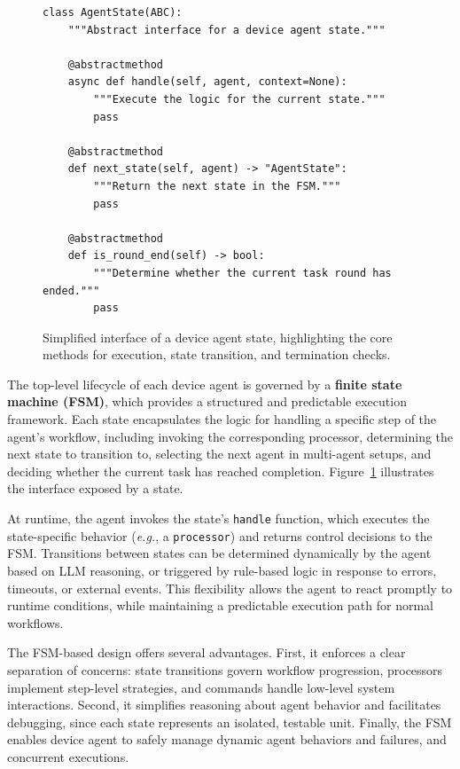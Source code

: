 \documentclass[10pt]{article} %
\newcommand{\eg}{\textit{e.g.},\xspace}
\begin{document}
\begin{figure}[t]
\centering
\begin{minipage}{\columnwidth}
\begin{lstlisting}[style=pythonstyle, label={lst:state-interface}]
class AgentState(ABC):
    """Abstract interface for a device agent state."""

    @abstractmethod
    async def handle(self, agent, context=None):
        """Execute the logic for the current state."""
        pass

    @abstractmethod
    def next_state(self, agent) -> "AgentState":
        """Return the next state in the FSM."""
        pass

    @abstractmethod
    def is_round_end(self) -> bool:
        """Determine whether the current task round has ended."""
        pass
\end{lstlisting}
\end{minipage}
\caption{Simplified interface of a device agent state, highlighting the core methods for execution, state transition, and termination checks.}
\vspace{-1em}
\label{fig:state-interface}
\end{figure}
The top-level lifecycle of each device agent is governed by a \textbf{finite state machine (FSM)}, which provides a structured and predictable execution framework. Each state encapsulates the logic for handling a specific step of the agent's workflow, including invoking the corresponding processor, determining the next state to transition to, selecting the next agent in multi-agent setups, and deciding whether the current task has reached completion. Figure~\ref{fig:state-interface} illustrates the interface exposed by a state.

At runtime, the agent invokes the state's \texttt{handle} function, which executes the state-specific behavior (\eg a \texttt{processor}) and returns control decisions to the FSM. Transitions between states can be determined dynamically by the agent based on LLM reasoning, or triggered by rule-based logic in response to errors, timeouts, or external events. This flexibility allows the agent to react promptly to runtime conditions, while maintaining a predictable execution path for normal workflows.

The FSM-based design offers several advantages. First, it enforces a clear separation of concerns: state transitions govern workflow progression, processors implement step-level strategies, and commands handle low-level system interactions. Second, it simplifies reasoning about agent behavior and facilitates debugging, since each state represents an isolated, testable unit. Finally, the FSM enables device agent to safely manage dynamic agent behaviors and failures, and concurrent executions.
\end{document}
